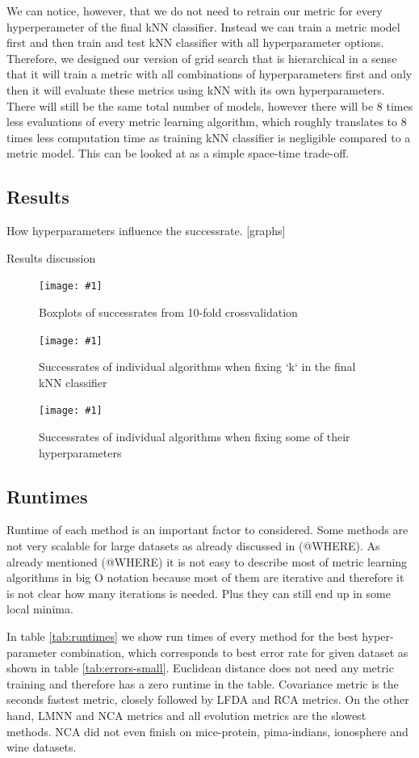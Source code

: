 \documentclass[12pt,a4paper]{report}
\newcommand{\cenfig}[3]{
\begin{figure}[ht]
	\centering
    \texttt{[image: \#1]}
    \caption{#2} \label{#3}
\end{figure}
}
\begin{document}
We can notice, however, that we do not need to retrain our metric for every hyperperameter of the final kNN classifier. Instead we can train a metric model first and then train and test kNN classifier with all hyperparameter options. Therefore, we designed our version of grid search that is hierarchical in a sense that it will train a metric with all combinations of hyperparameters first and only then it will evaluate these metrics using kNN with its own hyperparameters. There will still be the same total number of models, however there will be 8 times less evaluations of every metric learning algorithm, which roughly translates to 8 times less computation time as training kNN classifier is negligible compared to a metric model. This can be looked at as a simple space-time trade-off.


\subsection{Results}

How hyperparameters influence the successrate. [graphs] %

Results discussion %




\cenfig{graphs/classification/sr.pdf}{Boxplots of successrates from 10-fold crossvalidation}{fig:cl:sr}

\cenfig{graphs/classification/sr_knn}{Successrates of individual algorithms when fixing `k` in the final kNN classifier}{fig:cl:kpar}

\cenfig{graphs/classification/sr_hyp}{Successrates of individual algorithms when fixing some of their hyperparameters}{fig:cl:hyp}

\subsection{Runtimes}

Runtime of each method is an important factor to considered. Some methods are not very scalable for large datasets as already discussed in (@WHERE). As already mentioned (@WHERE) it is not easy to describe most of metric learning algorithms in big O notation because most of them are iterative and therefore it is not clear how many iterations is needed. Plus they can still end up in some local minima.

In table \ref{tab:runtimes} we show run times of every method for the best hyper-parameter combination, which corresponds to best error rate for given dataset as shown in table \ref{tab:errors-small}. Euclidean distance does not need any metric training and therefore has a zero runtime in the table. Covariance metric is the seconds fastest metric, closely followed by LFDA and RCA metrics. On the other hand, LMNN and NCA metrics and all evolution metrics are the slowest methods. NCA did not even finish on mice-protein, pima-indians, ionosphere and wine datasets.
\end{document}
